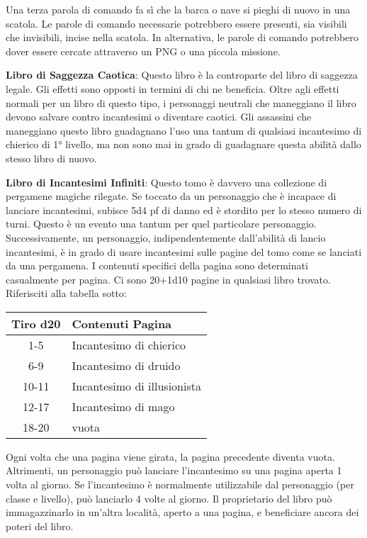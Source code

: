 \documentclass{article}
\begin{document}
\begin{multicols}{2}
Una terza parola di comando fa sì che la barca o nave si pieghi di nuovo in una scatola. Le parole di comando necessarie potrebbero essere presenti, sia visibili che invisibili, incise nella scatola. In alternativa, le parole di comando potrebbero dover essere cercate attraverso un PNG o una piccola missione.

\textbf{Libro di Saggezza Caotica}: Questo libro è la controparte del libro di saggezza legale. Gli effetti sono opposti in termini di chi ne beneficia. Oltre agli effetti normali per un libro di questo tipo, i personaggi neutrali che maneggiano il libro devono salvare contro incantesimi o diventare caotici. Gli assassini che maneggiano questo libro guadagnano l'uso una tantum di qualsiasi incantesimo di chierico di 1° livello, ma non sono mai in grado di guadagnare questa abilità dallo stesso libro di nuovo.

\textbf{Libro di Incantesimi Infiniti}: Questo tomo è davvero una collezione di pergamene magiche rilegate. Se toccato da un personaggio che è incapace di lanciare incantesimi, subisce 5d4 pf di danno ed è stordito per lo stesso numero di turni. Questo è un evento una tantum per quel particolare personaggio. Successivamente, un personaggio, indipendentemente dall'abilità di lancio incantesimi, è in grado di usare incantesimi sulle pagine del tomo come se lanciati da una pergamena. I contenuti specifici della pagina sono determinati casualmente per pagina. Ci sono 20+1d10 pagine in qualsiasi libro trovato. Riferisciti alla tabella sotto:

\begin{table}[h]
\centering
\begin{tabular}{|c|l|}
\hline
\textbf{Tiro d20} & \textbf{Contenuti Pagina} \\
\hline
1-5 & Incantesimo di chierico \\
6-9 & Incantesimo di druido \\
10-11 & Incantesimo di illusionista \\
12-17 & Incantesimo di mago \\
18-20 & vuota \\
\hline
\end{tabular}

\end{table}

Ogni volta che una pagina viene girata, la pagina precedente diventa vuota. Altrimenti, un personaggio può lanciare l'incantesimo su una pagina aperta 1 volta al giorno. Se l'incantesimo è normalmente utilizzabile dal personaggio (per classe e livello), può lanciarlo 4 volte al giorno. Il proprietario del libro può immagazzinarlo in un'altra località, aperto a una pagina, e beneficiare ancora dei poteri del libro.


\end{multicols}
\end{document}
